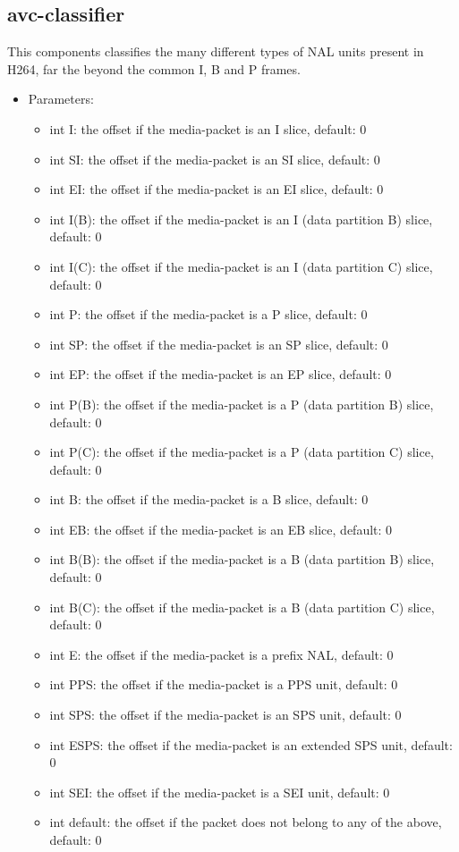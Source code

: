 \subsection{avc-classifier}
This components classifies the many different types of NAL units present in H264, far the beyond the common I, B and P frames.
\begin{itemize}
\item Parameters:
\begin{itemize}
\item int I: the offset if the media-packet is an I slice, default: 0
\item int SI: the offset if the media-packet is an SI slice, default: 0
\item int EI: the offset if the media-packet is an EI slice, default: 0
\item int I(B): the offset if the media-packet is an I (data partition B) slice, default: 0
\item int I(C): the offset if the media-packet is an I (data partition C) slice, default: 0
\item int P: the offset if the media-packet is a P slice, default: 0
\item int SP: the offset if the media-packet is an SP slice, default: 0
\item int EP: the offset if the media-packet is an EP slice, default: 0
\item int P(B): the offset if the media-packet is a P (data partition B) slice, default: 0
\item int P(C): the offset if the media-packet is a P (data partition C) slice, default: 0
\item int B: the offset if the media-packet is a B slice, default: 0
\item int EB: the offset if the media-packet is an EB slice, default: 0
\item int B(B): the offset if the media-packet is a B (data partition B) slice, default: 0
\item int B(C): the offset if the media-packet is a B (data partition C) slice, default: 0
\item int E: the offset if the media-packet is a prefix NAL, default: 0
\item int PPS: the offset if the media-packet is a PPS unit, default: 0
\item int SPS: the offset if the media-packet is an SPS unit, default: 0
\item int ESPS: the offset if the media-packet is an extended SPS unit, default: 0
\item int SEI: the offset if the media-packet is a SEI unit, default: 0
\item int default: the offset if the packet does not belong to any of the above, default: 0
\end{itemize}
\end{itemize}
